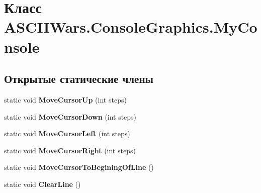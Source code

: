 \hypertarget{class_a_s_c_i_i_wars_1_1_console_graphics_1_1_my_console}{}\section{Класс A\+S\+C\+I\+I\+Wars.\+Console\+Graphics.\+My\+Console}
\label{class_a_s_c_i_i_wars_1_1_console_graphics_1_1_my_console}
\subsection*{Открытые статические члены}
\begin{DoxyCompactItemize}
\item 
\hypertarget{class_a_s_c_i_i_wars_1_1_console_graphics_1_1_my_console_ac514523e267519ad39f15457b948112f}{}\label{class_a_s_c_i_i_wars_1_1_console_graphics_1_1_my_console_ac514523e267519ad39f15457b948112f} 
static void {\bfseries Move\+Cursor\+Up} (int steps)
\item 
\hypertarget{class_a_s_c_i_i_wars_1_1_console_graphics_1_1_my_console_aa22019c9afb2464aa8a1adbfacf2e979}{}\label{class_a_s_c_i_i_wars_1_1_console_graphics_1_1_my_console_aa22019c9afb2464aa8a1adbfacf2e979} 
static void {\bfseries Move\+Cursor\+Down} (int steps)
\item 
\hypertarget{class_a_s_c_i_i_wars_1_1_console_graphics_1_1_my_console_a0dab60fcee6c6b175a913e5d6d9f8c95}{}\label{class_a_s_c_i_i_wars_1_1_console_graphics_1_1_my_console_a0dab60fcee6c6b175a913e5d6d9f8c95} 
static void {\bfseries Move\+Cursor\+Left} (int steps)
\item 
\hypertarget{class_a_s_c_i_i_wars_1_1_console_graphics_1_1_my_console_adfccb3e8bafbe5d101a743cba7c05f43}{}\label{class_a_s_c_i_i_wars_1_1_console_graphics_1_1_my_console_adfccb3e8bafbe5d101a743cba7c05f43} 
static void {\bfseries Move\+Cursor\+Right} (int steps)
\item 
\hypertarget{class_a_s_c_i_i_wars_1_1_console_graphics_1_1_my_console_a77af8cdcc9b62a3dccf066db376c8c57}{}\label{class_a_s_c_i_i_wars_1_1_console_graphics_1_1_my_console_a77af8cdcc9b62a3dccf066db376c8c57} 
static void {\bfseries Move\+Cursor\+To\+Begining\+Of\+Line} ()
\item 
\hypertarget{class_a_s_c_i_i_wars_1_1_console_graphics_1_1_my_console_ac04c03e53cde550f545e47e737f49f35}{}\label{class_a_s_c_i_i_wars_1_1_console_graphics_1_1_my_console_ac04c03e53cde550f545e47e737f49f35} 
static void {\bfseries Clear\+Line} ()
\item 

\end{DoxyCompactItemize}
